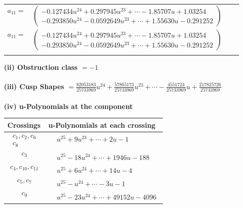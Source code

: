 \documentclass[1p]{elsarticle_modified}
\theoremstyle{definition}
\begin{document}
\begin{tabular}{m{7pt} m{180pt} m{7pt} m{180pt} }
\flushright $a_{11}=$&$\begin{pmatrix}-0.127434 u^{24}+0.297945 u^{23}+\cdots-1.85707 u+1.03254\\-0.293850 u^{24}-0.0592649 u^{23}+\cdots+1.55630 u-0.291252\end{pmatrix}$\\ \flushright $a_{11}=$&$\begin{pmatrix}-0.127434 u^{24}+0.297945 u^{23}+\cdots-1.85707 u+1.03254\\-0.293850 u^{24}-0.0592649 u^{23}+\cdots+1.55630 u-0.291252\end{pmatrix}$\\&\end{tabular}
\flushleft \textbf{(ii) Obstruction class $= -1$}\\~\\
\flushleft \textbf{(iii) Cusp Shapes $= \frac{82053183}{25733969} u^{24}+\frac{57865173}{25733969} u^{23}+\cdots-\frac{4551724}{25733969} u+\frac{217825726}{25733969}$}\\~\\
\newpage\renewcommand{\arraystretch}{1}
\flushleft \textbf{(iv) u-Polynomials at the component}\newline \\
\begin{tabular}{m{50pt}|m{274pt}}
Crossings & \hspace{64pt}u-Polynomials at each crossing \\
\hline $$\begin{aligned}c_{1},c_{2},c_{6}\\c_{8}\end{aligned}$$&$\begin{aligned}
&u^{25}+9 u^{23}+\cdots+2 u-1
\end{aligned}$\\
\hline $$\begin{aligned}c_{3}\end{aligned}$$&$\begin{aligned}
&u^{25}-18 u^{24}+\cdots+1946 u-188
\end{aligned}$\\
\hline $$\begin{aligned}c_{4},c_{10},c_{11}\end{aligned}$$&$\begin{aligned}
&u^{25}+6 u^{24}+\cdots+14 u-4
\end{aligned}$\\
\hline $$\begin{aligned}c_{5},c_{7}\end{aligned}$$&$\begin{aligned}
&u^{25}- u^{24}+\cdots-3 u-1
\end{aligned}$\\
\hline $$\begin{aligned}c_{9}\end{aligned}$$&$\begin{aligned}
&u^{25}-23 u^{24}+\cdots+49152 u-4096
\end{aligned}$\\
\hline
\end{tabular}\\~\\
\end{document}
